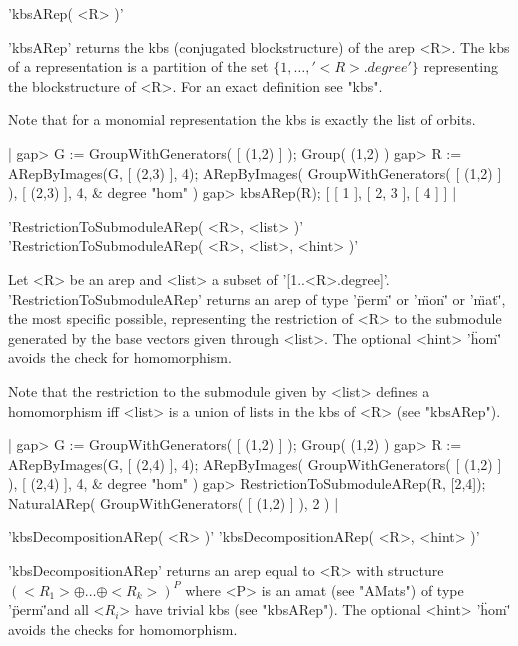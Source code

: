 
'kbsARep( <R> )'

'kbsARep' returns the kbs (conjugated blockstructure) 
of the arep <R>. The kbs of a representation is a partition
of the set $\{1,\dots,'<R>.degree'\}$ representing the blockstructure
of <R>. For an exact definition see "kbs".

Note that for a monomial representation the kbs is exactly the
list of orbits.

|    gap> G := GroupWithGenerators( [ (1,2) ] );
    Group( (1,2) )
    gap> R := ARepByImages(G, [ (2,3) ], 4);                                  
    ARepByImages(
      GroupWithGenerators( [ (1,2) ] ),
      [ (2,3) ],
      4, & degree
      "hom"
    )
    gap> kbsARep(R);
    [ [ 1 ], [ 2, 3 ], [ 4 ] ] |


'RestrictionToSubmoduleARep( <R>, <list> )'\\
'RestrictionToSubmoduleARep( <R>, <list>, <hint> )'

Let <R> be an arep and <list> a subset of '[1..<R>.degree]'. 
'RestrictionToSubmoduleARep' returns an arep of type 
'\"perm\"' or '\"mon\"' or '\"mat\"', the most specific 
possible, representing the restriction of <R> to the submodule
generated by the base vectors given through <list>.
The optional <hint> '\"hom\"' avoids the check for homomorphism.

Note that the restriction to the submodule given by <list>
defines a homomorphism iff <list> is a union of lists in the
kbs of <R> (see "kbsARep").

|    gap> G := GroupWithGenerators( [ (1,2) ] );
    Group( (1,2) )
    gap> R := ARepByImages(G, [ (2,4) ], 4);  
    ARepByImages(
      GroupWithGenerators( [ (1,2) ] ),
      [ (2,4) ],
      4, & degree
      "hom"
    )
    gap> RestrictionToSubmoduleARep(R, [2,4]);
    NaturalARep( GroupWithGenerators( [ (1,2) ] ), 2 ) |


'kbsDecompositionARep( <R> )'
'kbsDecompositionARep( <R>, <hint> )'

'kbsDecompositionARep' returns an arep equal to <R> with
structure $(<R_1>\oplus\dots\oplus<R_k>)^P$ where <P> is 
an amat (see "AMats") of type '\"perm\"'and all <$R_i$> have 
trivial kbs (see "kbsARep").
The optional <hint> '\"hom\"' avoids the checks for homomorphism.

